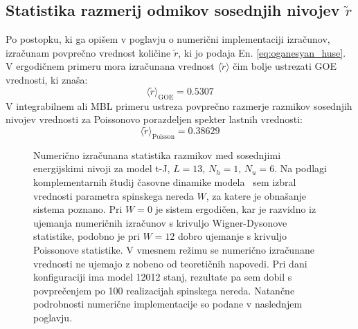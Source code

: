 \documentclass[10pt,a4paper]{article}
\begin{document}
 \subsection{Statistika razmerij odmikov sosednjih nivojev $\tilde{r}$}
 Po postopku, ki ga opišem v poglavju o numerični implementaciji izračunov, izračunam povprečno vrednost količine $\tilde{r}$, ki jo podaja En. \eqref{eq:oganesyan_huse}. V ergodičnem primeru mora izračunana vrednost $\langle \tilde{r}\rangle$ čim bolje ustrezati GOE vrednosti, ki znaša:
 \begin{equation}\label{eq:r_GOE}
 \langle \tilde{r}\rangle_\mathrm{GOE}=0.5307
 \end{equation}
 V integrabilnem ali MBL primeru ustreza povprečno razmerje razmikov sosednjih nivojev vrednosti za Poissonovo porazdeljen spekter lastnih vrednosti: 
 \begin{equation}\label{eq:r_poisson}
 \langle \tilde{r}\rangle_\mathrm{Poisson}=0.38629
 \end{equation}

\begin{figure}[H]
\caption{Numerično izračunana statistika razmikov med sosednjimi energijskimi nivoji za model t-J, $L=13$, $N_h=1$, $N_u=6$. Na podlagi komplementarnih študij časovne dinamike modela~\cite{lemut2017complete} sem izbral vrednosti parametra spinskega nereda $W$, za katere je obnašanje sistema poznano. Pri $W=0$ je sistem ergodičen, kar je razvidno iz ujemanja numeričnih izračunov s krivuljo Wigner-Dysonove statistike, podobno je pri $W=12$ dobro ujemanje s krivuljo Poissonove statistike. V vmesnem režimu se numerično izračunane vrednosti ne ujemajo z nobeno od teoretičnih napovedi. Pri dani konfiguraciji ima model 12012 stanj, rezultate pa sem dobil s povprečenjem po 100 realizacijah spinskega nereda. Natančne podrobnosti numerične implementacije so podane v naslednjem poglavju.  }
\label{fig:unfolding_demo_three_slo}
\end{figure}
\end{document}

